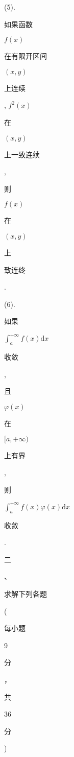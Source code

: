 \documentclass[10pt]{article}
\begin{document}
(5). \begin{CJK}{UTF8}{mj}如果函数\end{CJK} $f(x)$ \begin{CJK}{UTF8}{mj}在有限开区间\end{CJK} $(x, y)$ \begin{CJK}{UTF8}{mj}上连续\end{CJK}, $f^{2}(x)$ \begin{CJK}{UTF8}{mj}在\end{CJK} $(x, y)$ \begin{CJK}{UTF8}{mj}上一致连续\end{CJK}, \begin{CJK}{UTF8}{mj}则\end{CJK} $f(x)$ \begin{CJK}{UTF8}{mj}在\end{CJK} $(x, y)$ \begin{CJK}{UTF8}{mj}上\end{CJK} \begin{CJK}{UTF8}{mj}致连终\end{CJK}.

(6). \begin{CJK}{UTF8}{mj}如果\end{CJK} $\int_{a}^{+\infty} f(x) \mathrm{d} x$ \begin{CJK}{UTF8}{mj}收敛\end{CJK}, \begin{CJK}{UTF8}{mj}且\end{CJK} $\varphi(x)$ \begin{CJK}{UTF8}{mj}在\end{CJK} $[a,+\infty)$ \begin{CJK}{UTF8}{mj}上有界\end{CJK}, \begin{CJK}{UTF8}{mj}则\end{CJK} $\int_{a}^{+\infty} f(x) \varphi(x) \mathrm{d} x$ \begin{CJK}{UTF8}{mj}收敛\end{CJK}.

\begin{CJK}{UTF8}{mj}二\end{CJK}、\begin{CJK}{UTF8}{mj}求解下列各题\end{CJK} (\begin{CJK}{UTF8}{mj}每小题\end{CJK} 9 \begin{CJK}{UTF8}{mj}分\end{CJK}，\begin{CJK}{UTF8}{mj}共\end{CJK} 36 \begin{CJK}{UTF8}{mj}分\end{CJK})
\end{document}
